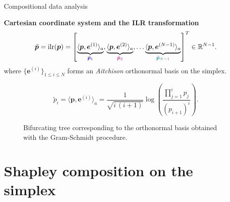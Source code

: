 \documentclass{beamer}
\DeclareMathOperator{\ilr}{ilr}
\begin{document}
\begin{frame}{Compositional data analysis}

  \textbf{Cartesian coordinate system and the ILR transformation}
\begin{equation}
    \tilde{\bm{p}}=\ilr(\bm{p}) = \left[\underbrace{\langle \bm{p}, \bm{e}^{(1)} \rangle_a}_{\color{blue} \tilde{\bm{p}}_1} , \underbrace{\langle \bm{p}, \bm{e}^{(2)} \rangle_a}_{\color{magenta} \tilde{\bm{p}}_2},\dots \underbrace{\langle \bm{p}, \bm{e}^{(N-1)} \rangle_a}_{\color{teal} \tilde{\bm{p}}_{N-1}}  \right]^T \in \mathbb{R}^{N-1}.
  \end{equation}
  where $\{\bm{e}^{(i)}\}_{1\leq i \leq N}$ forms an \emph{Aitchison} orthonormal basis on the simplex.
  \begin{figure}
    \begin{minipage}{0.39\textwidth}
      \centering
      
    \end{minipage}
    \begin{minipage}{0.6\textwidth}
      \small
      \begin{equation}
        \tilde{p}_i = \langle \bm{p}, \bm{e}^{(i)} \rangle_a = \frac{1}{\sqrt{i\,(i+1)}} \log \left( \frac{\prod\limits_{j = 1}^{i}p_j}{(p_{i+1})^{i}} \right).
      \end{equation}
    \end{minipage}
    \caption{Bifurcating tree corresponding to the orthonormal basis obtained with the Gram-Schmidt procedure.}
    \label{fig:bifurctree}
  \end{figure}
\end{frame}

\section{Shapley composition on the simplex}
\end{document}
